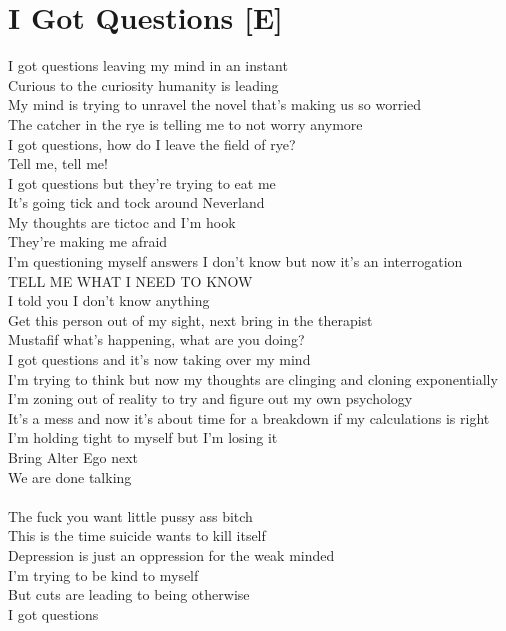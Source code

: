 \documentclass[12pt, b5paper, oneside]{book}
\begin{document}
\section{I Got Questions [E]}
I got questions leaving my mind in an instant
\\Curious to the curiosity humanity is leading
\\My mind is trying to unravel the novel that's making us so worried
\\The catcher in the rye is telling me to not worry anymore
\\I got questions, how do I leave the field of rye?
\\Tell me, tell me!
\\I got questions but they're trying to eat me
\\It's going tick and tock around Neverland
\\My thoughts are tictoc and I'm hook
\\They're making me afraid
\\I'm questioning myself answers I don't know but now it's an interrogation
\\TELL ME WHAT I NEED TO KNOW
\\I told you I don't know anything
\\Get this person out of my sight, next bring in the therapist
\\Mustafif what's happening, what are you doing?
\\I got questions and it's now taking over my mind
\\I'm trying to think but now my thoughts are clinging and cloning exponentially
\\I'm zoning out of reality to try and figure out my own psychology
\\It's a mess and now it's about time for a breakdown if my calculations is right
\\I'm holding tight to myself but I'm losing it
\\Bring Alter Ego next
\\We are done talking
%
\\\\The fuck you want little pussy ass bitch
\\This is the time suicide wants to kill itself
\\Depression is just an oppression for the weak minded
\\I'm trying to be kind to myself
\\But cuts are leading to being otherwise
\\I got questions
\end{document}

